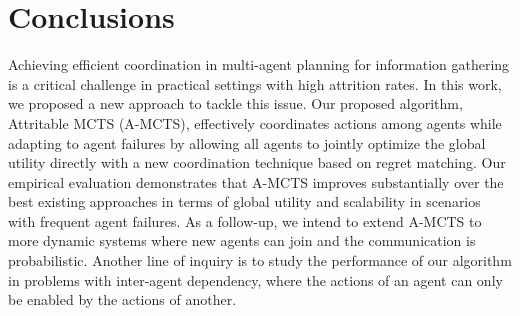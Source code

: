 \documentclass{ecai}
\begin{document}








\section{Conclusions}
Achieving efficient coordination in multi-agent planning for information gathering is a critical challenge in practical settings with high attrition rates. In this work, we proposed a new approach to tackle this issue. Our proposed algorithm, Attritable MCTS (A-MCTS), effectively coordinates actions among agents while adapting to agent failures by allowing all agents to jointly optimize the global utility directly with a new coordination technique based on regret matching. Our empirical evaluation demonstrates that A-MCTS improves substantially over the best existing approaches in terms of global utility and scalability in scenarios with frequent agent failures. As a follow-up, we intend to extend A-MCTS to more dynamic systems where new agents can join and the communication is probabilistic. Another line of inquiry is to study the performance of our algorithm in problems with inter-agent dependency, where the actions of an agent can only be enabled by the actions of another.


\clearpage

\newpage

\end{document}
